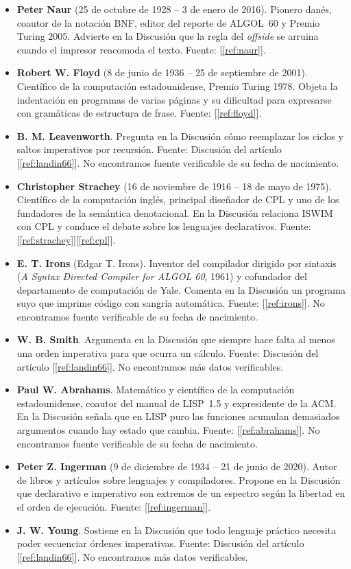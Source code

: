 \documentclass[11pt,twoside,openany]{report}
\newcommand{\fuente}[1]{{\color{acento}[\ref{#1}]}}
\begin{document}
{\begin{itemize}[itemsep=1pt, topsep=2pt]
  \item \textbf{Peter Naur} (25 de octubre de 1928 -- 3 de enero de 2016). Pionero danés, coautor de la notación BNF, editor del reporte de ALGOL~60 y Premio Turing 2005. Advierte en la Discusión que la regla del \emph{offside} se arruina cuando el impresor reacomoda el texto. Fuente: \fuente{ref:naur}.
  \item \textbf{Robert W. Floyd} (8 de junio de 1936 -- 25 de septiembre de 2001). Científico de la computación estadounidense, Premio Turing 1978. Objeta la indentación en programas de varias páginas y su dificultad para expresarse con gramáticas de estructura de frase. Fuente: \fuente{ref:floyd}.
  \item \textbf{B. M. Leavenworth}. Pregunta en la Discusión cómo reemplazar los ciclos y saltos imperativos por recursión. Fuente: Discusión del artículo \fuente{ref:landin66}. No encontramos fuente verificable de su fecha de nacimiento.
  \item \textbf{Christopher Strachey} (16 de noviembre de 1916 -- 18 de mayo de 1975). Científico de la computación inglés, principal diseñador de CPL y uno de los fundadores de la semántica denotacional. En la Discusión relaciona ISWIM con CPL y conduce el debate sobre los lenguajes declarativos. Fuente: \fuente{ref:strachey}\fuente{ref:cpl}.
  \item \textbf{E. T. Irons} (Edgar T. Irons). Inventor del compilador dirigido por sintaxis (\emph{A Syntax Directed Compiler for ALGOL 60}, 1961) y cofundador del departamento de computación de Yale. Comenta en la Discusión un programa suyo que imprime código con sangría automática. Fuente: \fuente{ref:irons}. No encontramos fuente verificable de su fecha de nacimiento.
  \item \textbf{W. B. Smith}. Argumenta en la Discusión que siempre hace falta al menos una orden imperativa para que ocurra un cálculo. Fuente: Discusión del artículo \fuente{ref:landin66}. No encontramos más datos verificables.
  \item \textbf{Paul W. Abrahams}. Matemático y científico de la computación estadounidense, coautor del manual de LISP~1.5 y expresidente de la ACM. En la Discusión señala que en LISP puro las funciones acumulan demasiados argumentos cuando hay estado que cambia. Fuente: \fuente{ref:abrahams}. No encontramos fuente verificable de su fecha de nacimiento.
  \item \textbf{Peter Z. Ingerman} (9 de diciembre de 1934 -- 21 de junio de 2020). Autor de libros y artículos sobre lenguajes y compiladores. Propone en la Discusión que declarativo e imperativo son extremos de un espectro según la libertad en el orden de ejecución. Fuente: \fuente{ref:ingerman}.
  \item \textbf{J. W. Young}. Sostiene en la Discusión que todo lenguaje práctico necesita poder secuenciar órdenes imperativas. Fuente: Discusión del artículo \fuente{ref:landin66}. No encontramos más datos verificables.
\end{itemize}
}
\end{document}
